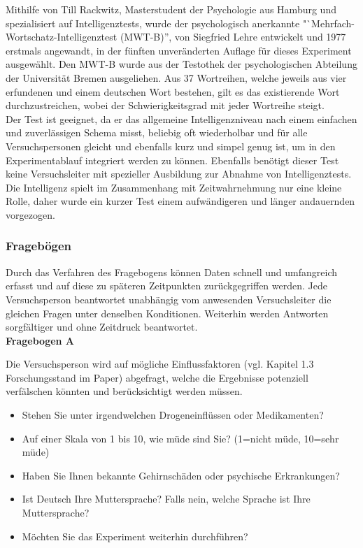 \documentclass{Bericht}
\begin{document}
Mithilfe von Till Rackwitz, Masterstudent der Psychologie aus Hamburg und spezialisiert auf Intelligenztests, wurde der psychologisch anerkannte "`Mehrfach-Wortschatz-Intelligenztest (MWT-B)'', von Siegfried Lehre entwickelt und 1977 erstmals angewandt, in der fünften unveränderten Auflage für dieses Experiment ausgewählt. 
Den MWT-B wurde aus der Testothek der psychologischen Abteilung der Universität Bremen ausgeliehen. Aus 37 Wortreihen, welche jeweils aus vier erfundenen und einem deutschen Wort bestehen, gilt es das existierende Wort durchzustreichen, wobei der Schwierigkeitsgrad mit jeder Wortreihe steigt.\\
Der Test ist geeignet, da er das allgemeine Intelligenzniveau nach einem einfachen und zuverlässigen Schema misst, beliebig oft wiederholbar und für alle Versuchspersonen gleicht und ebenfalls kurz und simpel genug ist, um in den Experimentablauf integriert werden zu können. Ebenfalls benötigt dieser Test keine Versuchsleiter mit spezieller Ausbildung zur Abnahme von Intelligenztests. \\
Die Intelligenz spielt im Zusammenhang mit Zeitwahrnehmung nur eine kleine Rolle, daher wurde ein kurzer Test einem aufwändigeren und länger andauernden vorgezogen. 
\subsubsection{Fragebögen}
Durch das Verfahren des Fragebogens können Daten schnell und umfangreich erfasst und auf diese zu späteren Zeitpunkten zurückgegriffen werden. Jede Versuchsperson beantwortet unabhängig vom anwesenden Versuchsleiter die gleichen Fragen unter denselben Konditionen. Weiterhin werden Antworten sorgfältiger und ohne Zeitdruck beantwortet.\\

\label{subsec:fragebogen}
\textbf{Fragebogen A}

Die Versuchsperson wird auf mögliche Einflussfaktoren (vgl. Kapitel 1.3 Forschungsstand im Paper) abgefragt, welche die Ergebnisse potenziell verfälschen könnten und berücksichtigt werden müssen.
\begin{itemize}
	\setlength{\itemsep}{0em}
	\item Stehen Sie unter irgendwelchen Drogeneinflüssen oder Medikamenten?
	\item Auf einer Skala von 1 bis 10, wie müde sind Sie? (1=nicht müde, 10=sehr müde)
	\item Haben Sie Ihnen bekannte Gehirnschäden oder psychische Erkrankungen?
	\item Ist Deutsch Ihre Muttersprache? Falls nein, welche Sprache ist Ihre Muttersprache?
	\item Möchten Sie das Experiment weiterhin durchführen?
\end{itemize}
\end{document}
